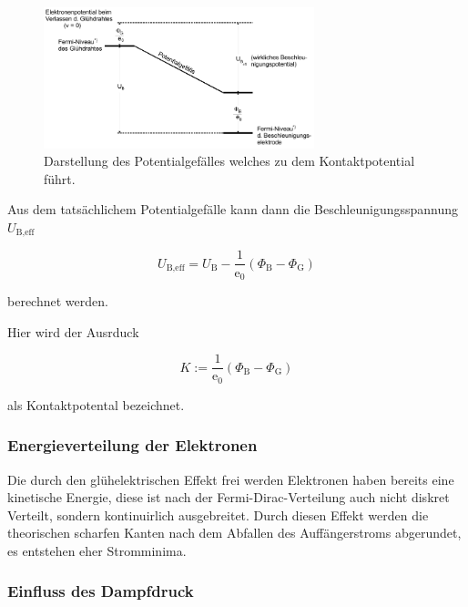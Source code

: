             \begin{figure}[ht]
                \centering
                \includegraphics[width=0.7\textwidth]{latex/images/Kontaktpotential.PNG}
                \caption{Darstellung des Potentialgefälles welches zu dem Kontaktpotential führt.}
                \label{img:pot}
            \end{figure}

            \noindent Aus dem tatsächlichem Potentialgefälle kann dann die Beschleunigungsspannung $U_{\text{B,eff}}$ 
            
            \begin{equation*}
                U_{\text{B,eff}} = U_{\text{B}} - \frac{1}{\text{e}_0} ( \Phi_{\text{B}} - \Phi_{\text{G}})
            \end{equation*}

            \noindent berechnet werden.

            \noindent Hier wird der Ausrduck 

            \begin{equation*}
                K := \frac{1}{\text{e}_0} ( \Phi_{\text{B}} - \Phi_{\text{G}})
            \end{equation*}

            \noindent als Kontaktpotental bezeichnet.

        \subsubsection{Energieverteilung der Elektronen}

            \noindent Die durch den glühelektrischen Effekt frei werden Elektronen haben bereits eine kinetische Energie, diese ist nach 
            der Fermi-Dirac-Verteilung auch nicht diskret Verteilt, sondern kontinuirlich ausgebreitet. Durch diesen Effekt werden die theorischen 
            scharfen Kanten nach dem Abfallen des Auffängerstroms abgerundet, es entstehen eher Stromminima.

        \subsubsection{Einfluss des Dampfdruck}


